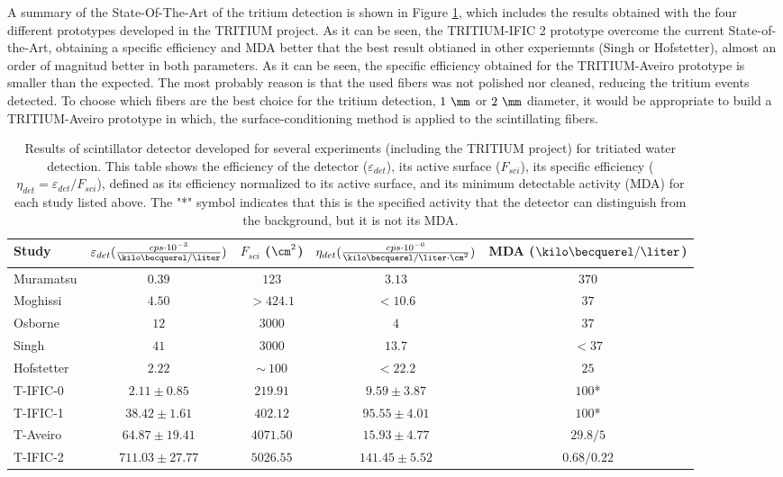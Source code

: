 \begin{itemize}
A summary of the State-Of-The-Art of the tritium detection is shown in Figure \ref{tab:ComparisonResultsTritium}, which includes the results obtained with the four different prototypes developed in the TRITIUM project. As it can be seen, the TRITIUM-IFIC 2 prototype overcome the current State-of-the-Art, obtaining a specific efficiency and MDA better that the best result obtianed in other experiemnts (Singh or Hofstetter), almost an order of magnitud better in both parameters. As it can be seen, the specific efficiency obtained for the TRITIUM-Aveiro prototype is smaller than the expected. The most probably reason is that the used fibers was not polished nor cleaned, reducing the tritium events detected. To choose which fibers are the best choice for the tritium detection, $1~\mm$ or $2~\mm$ diameter, it would be appropriate to build a TRITIUM-Aveiro prototype in which, the surface-conditioning method is applied to the scintillating fibers.

\begin{table}[htbp]
\centering{}%
\begin{tabular}{lcccc}
\toprule 
Study & \parbox{5.5em}{$\varepsilon_{det}(\frac{cps \cdot{} 10^{-3}}{\kilo\becquerel/\liter})$}  & \parbox{4.5em}{$F_{sci}$ ($\cm^2$)}  & \parbox{6.5em}{$\eta_{det}(\frac{cps \cdot{} 10^{-6}}{\kilo\becquerel/ \liter \cdot{} \cm^2})$} & MDA ($\kilo\becquerel / \liter$) \tabularnewline
\midrule
\midrule 
Muramatsu & $0.39$ & $123$ & $3.13$ & $370$ \tabularnewline
Moghissi & $4.50$ & $>424.1$ & $<10.6$ & $37$ \tabularnewline
Osborne & $12$ & $3000$ & $4$ & $37$ \tabularnewline
Singh & $41$ & $3000$ & $13.7$ & $<37$ \tabularnewline
Hofstetter & $2.22$ & $\sim~100$ & $<22.2$ & $25$ \tabularnewline
T-IFIC-0 & $2.11 \pm 0.85$ & $219.91$ & $9.59 \pm 3.87$ & $100$* \tabularnewline
T-IFIC-1 & $38.42 \pm 1.61$ & $402.12$ & $95.55 \pm 4.01$ & $100$* \tabularnewline
T-Aveiro & $64.87 \pm 19.41$ & $4071.50$ & $15.93 \pm 4.77$ & $29.8/5$ \tabularnewline
T-IFIC-2 & $711.03 \pm 27.77$ & $5026.55$ & $141.45 \pm 5.52$ & $0.68/0.22$ \tabularnewline
\bottomrule
\end{tabular}
\caption{Results of scintillator detector developed for several experiments (including the TRITIUM project) for tritiated water detection. This table shows the efficiency of the detector ($\varepsilon_{det}$), its active surface ($F_{sci}$), its specific efficiency ($\eta_{det}=\varepsilon_{det}/F_{sci}$), defined as its efficiency normalized to its active surface, and its minimum detectable activity (MDA) for each study listed above. The "*" symbol indicates that this is the specified activity that the detector can distinguish from the background, but it is not its MDA.}
\label{tab:ComparisonResultsTritium}
\end{table}

\end{itemize}

